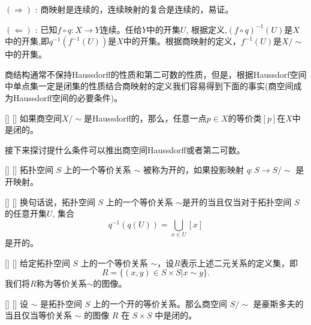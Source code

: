 \documentclass[UTF8]{ctexart}
\begin{document}
    \begin{prf}
        
        
        
        

        $(\Rightarrow)$ : 商映射是连续的，连续映射的复合是连续的，易证。

        $(\Leftarrow)$ : 已知$f \circ q : X \rightarrow Y$连续。任给$Y$中的开集$U$, 根据定义,$(f \circ q)^{-1}(U)$是$X$中的开集,即$q^{-1}(f^{-1}(U))$是$X$中的开集。根据商映射的定义，$f^{-1}(U)$是$X/\sim$中的开集。
    \end{prf}

    \vspace{10pt}
    
    商结构通常不保持Haussdorff的性质和第二可数的性质，但是，根据Haussdorf空间中单点集一定是闭集的性质结合商映射的定义我们容易得到下面的事实(商空间成为Haussdorff空间的必要条件)。

    \begin{ppt}
        []
        {}
        []
        []
        如果商空间$X / \sim$是Haussdorff的，那么，任意一点$p \in X$的等价类$[p]$在$X$中是闭的。
    \end{ppt}

    \vspace{10pt}
    
    接下来探讨提什么条件可以推出商空间Haussdorff或者第二可数。

    \begin{dfn}
        []
        {}
        []
        []
        拓扑空间 \( S \) 上的一个等价关系 \( \sim \) 被称为开的，如果投影映射 \( q : S \to S/\sim \) 是开映射。
    \end{dfn}

    \begin{rmk}
        []
        {}
        []
        []
        换句话说，拓扑空间 \( S \) 上的一个等价关系 \( \sim \)是开的当且仅当对于拓扑空间 \( S \)的任意开集$U$, 集合
        \[
            q^{-1}(q(U)) = \bigcup_{x \in U} [x]
        \]
        是开的。
    \end{rmk}

    \begin{dfn}
        []
        {}
        []
        []
        给定拓扑空间 \( S \) 上的一个等价关系 \( \sim \)，设$R$表示上述二元关系的定义集，即
        \[
            R = \{(x,y) \in S \times S | x \sim y\}.
        \]
        我们将$R$称为等价关系$\sim$的图像。
    \end{dfn}

    \begin{thm}
        []
        {}
        []
        []
    \label{qutienthaussdorff}
        设 \( \sim \) 是拓扑空间 \( S \) 上的一个开的等价关系。那么商空间 \( S/\sim \) 是豪斯多夫的当且仅当等价关系 \( \sim \) 的图像 \( R \) 在 \( S \times S \) 中是闭的。
    \end{thm}
\end{document}
